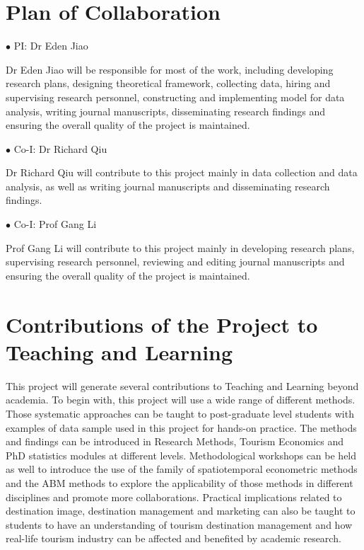 \documentclass[11pt,a4paper]{amsart}
\theoremstyle{plain}
\theoremstyle{definition}
\begin{document}
\section{Plan of Collaboration}
$\bullet$ PI: Dr Eden Jiao

\noindent Dr Eden Jiao will be responsible for most of the work, including developing research plans, designing theoretical framework, collecting data, hiring and supervising research personnel, constructing and implementing model for data analysis, writing journal manuscripts, disseminating research findings and ensuring the overall quality of the project is maintained. 
\vspace{3pt}

$\bullet$ Co-I: Dr Richard Qiu

\noindent Dr Richard Qiu will contribute to this project mainly in data collection and data analysis, as well as writing journal manuscripts and disseminating research findings.
\vspace{3pt}

$\bullet$ Co-I: Prof Gang Li

\noindent Prof Gang Li will contribute to this project mainly in developing research plans, supervising research personnel, reviewing and editing journal manuscripts and ensuring the overall quality of the project is maintained. 

\section{Contributions of the Project to Teaching and Learning}
\noindent This project will generate several contributions to Teaching and Learning beyond academia. To begin with, this project will use a wide range of different methods. Those systematic approaches can be taught to post-graduate level students with examples of data sample used in this project for hands-on practice. The methods and findings can be introduced in Research Methods, Tourism Economics and PhD statistics modules at different levels. Methodological workshops can be held as well to introduce the use of the family of spatiotemporal econometric methods and the ABM methods to explore the applicability of those methods in different disciplines and promote more collaborations. Practical implications related to destination image, destination management and marketing can also be taught to students to have an understanding of tourism destination management and how real-life tourism industry can be affected and benefited by academic research.
\end{document}
